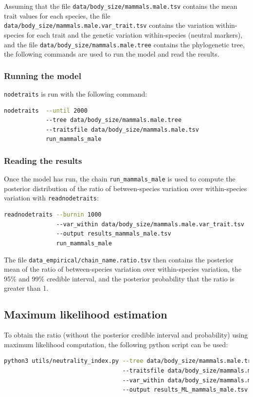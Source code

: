 \documentclass{article}
\begin{document}
Assuming that the file \texttt{data/body\_size/mammals.male.tsv} contains the mean trait values for each species, the file \texttt{data/body\_size/mammals.male.var\_trait.tsv} contains the variation within-species for each trait and the genetic variation within-species (neutral markers), and the file \texttt{data/body\_size/mammals.male.tree} contains the phylogenetic tree, the following commands are used to run the model and read the results.

\subsubsection{Running the model}
\texttt{nodetraits} is run with the following command:
\begin{lstlisting}[language = sh,label={lst:nodetraits-run}]
nodetraits  --until 2000
            --tree data/body_size/mammals.male.tree
            --traitsfile data/body_size/mammals.male.tsv
            run_mammals_male
\end{lstlisting}

\subsubsection{Reading the results}
Once the model has run, the chain \texttt{run\_mammals\_male} is used to compute the posterior distribution of the ratio of between-species variation over within-species variation with \texttt{readnodetraits}:
\begin{lstlisting}[language = sh,label={lst:readnodetraits-rho}]
readnodetraits --burnin 1000
               --var_within data/body_size/mammals.male.var_trait.tsv
               --output results_mammals_male.tsv
               run_mammals_male
\end{lstlisting}
The file \texttt{data\_empirical/chain\_name.ratio.tsv} then contains the posterior mean of the ratio of between-species variation over within-species variation, the 95\% and 99\% credible interval, and the posterior probability that the ratio is greater than 1.

\subsection{Maximum likelihood estimation}\label{subsec:maximum-likelihood-estimation}

To obtain the ratio (without the posterior credible interval and probability) using maximum likelihood computation, the following python script can be used:
\begin{lstlisting}[language = sh, label={lst:neutrality_index}]
python3 utils/neutrality_index.py --tree data/body_size/mammals.male.tree
                                  --traitsfile data/body_size/mammals.male.tsv
                                  --var_within data/body_size/mammals.male.var_trait.tsv
                                  --output results_ML_mammals_male.tsv
\end{lstlisting}
\end{document}
